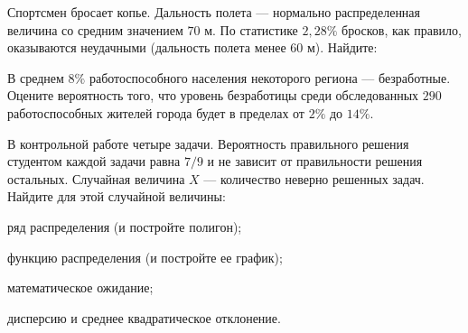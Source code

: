 \vfil

\begin{zkrPlain}{25}\noindent 
	Спортсмен бросает копье. Дальность полета — нормально распределенная величина со средним значением $70$ м. По статистике $2{,}28\%$ бросков, как правило, оказываются неудачными (дальность полета менее $60$ м).  Найдите: \par {}
 
\end{zkrPlain}

\vfil

\begin{zkrPlain}{25}\noindent 
	В среднем $ 8 \% $ работоспособного населения некоторого региона --- безработные. Оцените вероятность того, что уровень безработицы среди обследованных $ 290 $ работоспособных жителей города будет в пределах от $ 2 \% $ до $ 14 \% $.
 
\end{zkrPlain}

\newpage\setcounter{zad}{0}\setcounter{footnote}{0}



\begin{zkrPlain}{25}\noindent 
	В контрольной работе четыре задачи. Вероятность правильного решения студентом каждой задачи равна $7/9$ и не зависит от правильности решения остальных. Случайная величина $X$ --- количество неверно решенных задач.  Найдите для этой случайной величины: \par \smallskip\small{ \par \zz ряд распределения (и постройте полигон); \par \zz функцию распределения (и постройте ее график); \par \zz математическое ожидание; \par \zz дисперсию и среднее квадратическое отклонение.\par \par}
 
\end{zkrPlain}

\vfil

